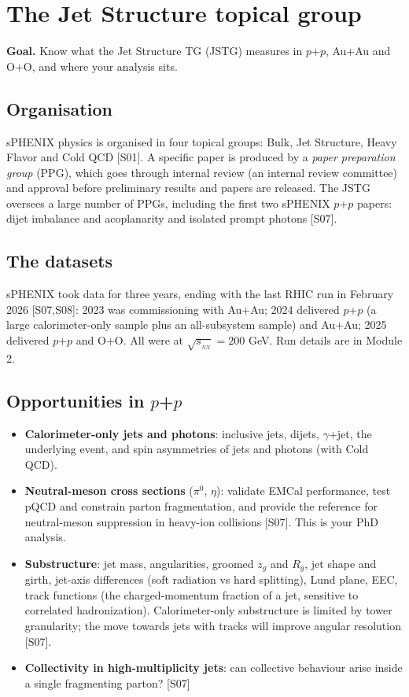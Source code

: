 \documentclass[11pt,letterpaper]{article}
\newcommand{\goal}[1]{\noindent\textbf{Goal.} #1\par}
\newcommand{\sqs}{\sqrt{s_{_{NN}}}}
\begin{document}
\section{The Jet Structure topical group}\label{sec:jstg}
\goal{Know what the Jet Structure TG (JSTG) measures in $p$+$p$, Au+Au and O+O, and where your analysis sits.}

\subsection{Organisation}
sPHENIX physics is organised in four topical groups: Bulk, Jet Structure, Heavy Flavor and Cold QCD [S01]. A specific
paper is produced by a \emph{paper preparation group} (PPG), which goes through internal review (an internal review
committee) and approval before preliminary results and papers are released. The JSTG oversees a large number of PPGs,
including the first two sPHENIX $p$+$p$ papers: dijet imbalance and acoplanarity \cite{dijet} and isolated prompt
photons \cite{isogamma} [S07].

\subsection{The datasets}
sPHENIX took data for three years, ending with the last RHIC run in February 2026 [S07,S08]: 2023 was commissioning
with Au+Au; 2024 delivered $p$+$p$ (a large calorimeter-only sample plus an all-subsystem sample) and Au+Au; 2025
delivered $p$+$p$ and O+O. All were at $\sqs=200$ GeV. Run details are in Module 2.

\subsection{Opportunities in $p$+$p$}
\begin{itemize}
\item \textbf{Calorimeter-only jets and photons}: inclusive jets, dijets, $\gamma$+jet, the underlying event, and spin
asymmetries of jets and photons (with Cold QCD).
\item \textbf{Neutral-meson cross sections} ($\pi^0$, $\eta$): validate EMCal performance, test pQCD and constrain parton
fragmentation, and provide the reference for neutral-meson suppression in heavy-ion collisions [S07]. This is your PhD analysis.
\item \textbf{Substructure}: jet mass, angularities, groomed $z_g$ and $R_g$, jet shape and girth, jet-axis differences
(soft radiation vs hard splitting), Lund plane, EEC, track functions (the charged-momentum fraction of a jet, sensitive to
correlated hadronization). Calorimeter-only substructure is limited by tower granularity; the move towards jets with tracks
will improve angular resolution [S07].
\item \textbf{Collectivity in high-multiplicity jets}: can collective behaviour arise inside a single fragmenting parton? [S07]
\end{itemize}
\end{document}
